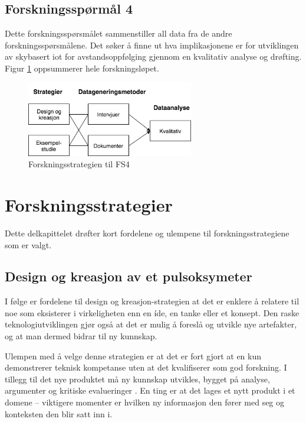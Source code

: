 \subsection{Forskningsspørmål 4}
\textbf{}

Dette forskningsspørsmålet sammenstiller all data fra de andre forskningsspørsmålene. Det søker å finne ut hva implikasjonene
er for utviklingen av skybasert \gls{iot} for avstandsoppfølging gjennom en kvalitativ analyse og drøfting.
Figur \ref{fig:oates_fs4} oppsummerer hele forskningsløpet.

\begin{figure}
\centering
\includegraphics[width=0.65\textwidth]{fig/oates/fs4}
\caption{Forskningsstrategien til FS4}
\label{fig:oates_fs4}
\end{figure}

\section{Forskningsstrategier}
\label{sec:forskningsstrategier}
Dette delkapittelet drøfter kort fordelene og ulempene til forskningsstrategiene som er valgt.

\subsection{Design og kreasjon av et pulsoksymeter}
I følge \citet[s.121-122]{oates} er fordelene til design og kreasjon-strategien at det er enklere å relatere til noe
som eksisterer i virkeligheten enn en íde, en tanke eller et konsept.
Den raske teknologiutviklingen gjør også at det er mulig å foreslå og utvikle nye artefakter, og at man dermed bidrar til ny kunnskap.

Ulempen med å velge denne strategien er at det er fort gjort at en kun demonstrerer
teknisk kompetanse uten at det kvalifiserer som god forskning. I tillegg til det nye produktet må ny kunnskap utvikles, bygget
på analyse, argumenter og kritiske evalueringer \citep[s. 109]{oates}. En ting er at det lages et nytt produkt i et domene --
viktigere momenter er hvilken ny informasjon den fører med seg og konteksten den blir satt inn i.

